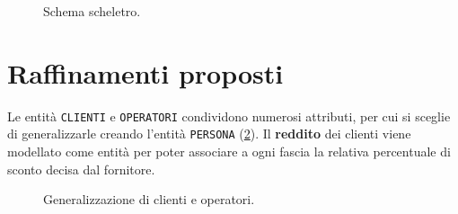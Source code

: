 \documentclass[a4paper,12pt]{report}
\begin{document}
\begin{figure}[H]
\centering{}
\caption{Schema scheletro.}
\label{fig:barebones}
\end{figure}

\section{Raffinamenti proposti}
Le entità \texttt{CLIENTI} e \texttt{OPERATORI} condividono numerosi attributi, per cui si sceglie di generalizzarle creando l'entità \texttt{PERSONA} (\cref{fig:persons}).
\newline
Il \textbf{reddito} dei clienti viene modellato come entità per poter associare a ogni fascia la relativa percentuale di sconto decisa dal fornitore.

\begin{figure}[H]
\centering{}
\caption{Generalizzazione di clienti e operatori.}
\label{fig:persons}
\end{figure}
\end{document}

